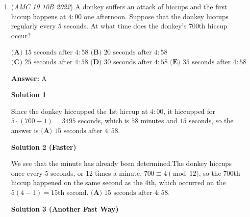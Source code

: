 \begin{enumerate}
There are 9 possibilities for the first choice of a three-digit number in the hundreds place, excluding $0$. Now we have a few cases:

 Case 1: The first digit is odd

 In this case, only $1$ even digit is permitted, since $3$ is impossible. The even digit can be either in the tens or the ones, so we have $5\cdot5\cdot2$ ways to place the even digit and odd digit.

 Case 2: The first digit is even

 In this case, either all digits can be even or the rest of the digits can be odd. That's $5\cdot5$ for both of them, yielding $5\cdot5\cdot2$ in total.

 Thus, both cases result in multiplying the $9$ by $5\cdot5\cdot2$, or $\boxed{\textbf{(D)~}450}$

 -ichang3765

 


	\item (\textit{AMC 10 10B 2022}) A donkey suffers an attack of hiccups and the first hiccup happens at $4:00$ one afternoon. Suppose that
the donkey hiccups regularly every $5$ seconds. At what time does the donkey’s $700$th hiccup occur?


 $\textbf{(A) }15 \text{ seconds after } 4:58$
$\textbf{(B) }20 \text{ seconds after } 4:58$
$\textbf{(C) }25 \text{ seconds after } 4:58$
$\textbf{(D) }30 \text{ seconds after } 4:58$
$\textbf{(E) }35 \text{ seconds after } 4:58$

 \textbf{Answer: }A



\textbf{Solution 1}

Since the donkey hiccupped the 1st hiccup at $4:00$, it hiccupped for $5 \cdot (700-1) = 3495$ seconds, which is $58$ minutes and $15$ seconds, so the answer is $\boxed{\textbf{(A) }15 \text{ seconds after } 4:58}$.

 



\textbf{Solution 2 (Faster)}

We see that the minute has already been determined.The donkey hiccups once every 5 seconds, or 12 times a minute. $700\equiv 4 \pmod{12}$, so the 700th hiccup happened on the same second as the 4th, which occurred on the $5(4-1)=15$th second. $\boxed{\textbf{(A) }15 \text{ seconds after } 4:58}$.

 



\textbf{Solution 3 (Another Fast Way)}


\end{enumerate}
